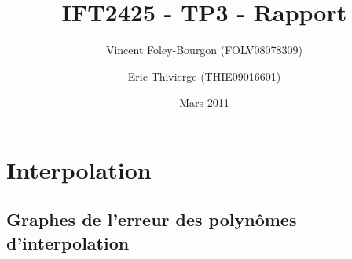 \documentclass[10pt]{article}
\begin{document}
\title{IFT2425 - TP3 - Rapport}
\date{Mars 2011}
\author{Vincent Foley-Bourgon (FOLV08078309) \and
  Eric Thivierge (THIE09016601)}

\maketitle

\section{Interpolation}

\subsection{Graphes de l'erreur des polynômes d'interpolation}
\end{document}
